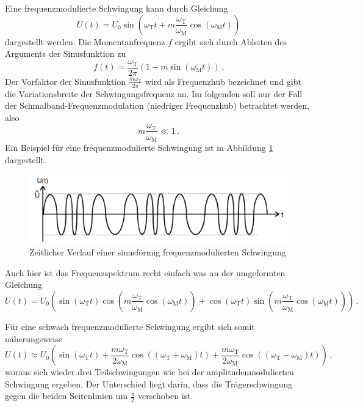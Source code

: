 Eine frequenzmodulierte Schwingung kann durch Gleichung
\begin{equation*}
    U(t) = U_\text{0} \sin{\left( \omega_\text{T} t + m \frac{\omega_\text{T}}{\omega_\text{M}} \cos{\left(\omega_\text{M} t\right)} \right)}
\end{equation*}
dargestellt werden.
Die Momentanfrequenz $f$ ergibt sich durch Ableiten des Arguments der Sinusfunktion zu
\begin{equation*}
    f(t) = \frac{\omega_\text{T}}{2 \pi} ( 1 - m \sin{\left(\omega_\text{M} t\right)}) \,.
\end{equation*}
Der Vorfaktor der Sinusfunktion $\frac{m \omega_\text{T}}{2 \pi}$ wird als Frequenzhub bezeichnet und gibt die Variationsbreite der Schwingungsfrequenz an.
Im folgenden soll nur der Fall der Schmalband-Frequenzmodulation (niedriger Frequenzhub) betrachtet werden, also 
\begin{equation*}
    m \frac{\omega_\text{T}}{\omega_\text{M}} \ll 1\,.
\end{equation*}
Ein Beispiel für eine frequenzmodulierte Schwingung ist in Abbildung \ref{fm:modulation} dargestellt.

\begin{figure}[!h]
    \centering
    \includegraphics[width = 14cm]{images/fm-modulation.png}
    \caption{Zeitlicher Verlauf einer sinusförmig frequenzmodulierten Schwingung}
    \label{fm:modulation}
\end{figure}

Auch hier ist das Frequenzspektrum recht einfach was an der umgeformten Gleichung 
\begin{equation*}
    U(t) = U_\text{0} \left( \sin{\left( \omega_\text{T} t \right) }\cos{\left(m\frac{\omega_\text{T}}{\omega_\text{M}} \cos{\left(\omega_\text{M} t\right)}\right)} + \cos{\left(\omega_\text{T} t\right)}\sin{\left(m\frac{\omega_\text{T}}{\omega_\text{M}} \cos{\left(\omega_\text{M} t\right)}\right)} \right)\,.
\end{equation*}

Für eine schwach frequenzmodulierte Schwingung ergibt sich somit näherungsweise
\begin{equation}
    U(t) \approx U_\text{0} \left( \sin{\left(\omega_\text{T} t\right)} + \frac{m \omega_\text{T}}{2 \omega_\text{M}} \cos{\left((\omega_\text{T} + \omega_\text{M}) t\right)} + \frac{m \omega_\text{T}}{2 \omega_\text{M}} \cos{\left((\omega_\text{T} - \omega_\text{M}) t\right)}\right) \,, \label{fm:kleiner_hub}
\end{equation}
woraus sich wieder drei Teilschwingungen wie bei der amplitudenmodulierten Schwingung ergeben.
Der Unterschied liegt darin, dass die Trägerschwingung gegen die beiden Seitenlinien um $\frac{\pi}{2}$ verschoben ist.

